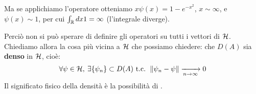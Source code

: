 \documentclass[FisicaTeorica.tex]{subfiles}
\begin{document}
\begin{enumerate}
\begin{es}
	Ma se applichiamo l'operatore otteniamo $x\psi \left(x\right)=1-e^{-x^2}$, $x\sim \infty$, e $\psi \left(x\right)\sim 1$, per cui $\int_{\mathbb{R}} dx 1=\infty$ (l'integrale diverge).
	\end{es}
	Perciò non si può sperare di definire gli operatori su tutti i vettori di $\mathcal{H}$.\\
	Chiediamo allora la cosa più vicina a $\mathcal{H}$ che possiamo chiedere: che $D\left(A\right)$ sia \textbf{denso} in $\mathcal{H}$, cioè:
	\[
	\forall \psi \in \mathcal{H},\> \exists \{\psi_n\} \subset D(A) \text{ t.c. } \left\lVert\psi_n -\psi\right\rVert \xrightarrow[n\to\infty]{} 0
	\]
	Il significato fisico della densità è la possibilità di .\\
\end{enumerate}
\end{document}
